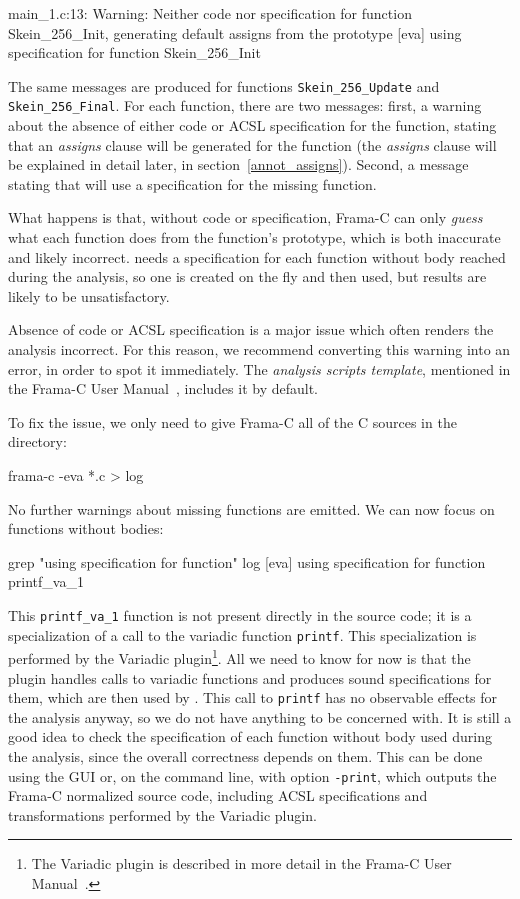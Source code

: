 \documentclass{frama-c-book}
\begin{document}
\begin{logsmath}
 main_1.c:13: Warning:
  Neither code nor specification for function Skein_256_Init,
  generating default assigns from the prototype
[eva] using specification for function Skein_256_Init
\end{logsmath}

The same messages are produced for functions \verb|Skein_256_Update| and
\verb|Skein_256_Final|.
For each function, there are two messages: first, a warning about the absence
of either code or ACSL specification for the function, stating
that an {\em assigns} clause will be generated for the function
(the {\em assigns} clause will be explained in detail later, in
section~\ref{annot_assigns}). Second, a message stating that \Eva{} will use a
specification for the missing function.

What happens is that, without code or specification, Frama-C can only
{\em guess} what each function does from the function's prototype,
which is both inaccurate and likely incorrect. \Eva{} needs a specification
for each function without body reached during the analysis, so one is created
on the fly and then used, but results are likely to be unsatisfactory.

\begin{important}
  Absence of code or ACSL specification is a major issue which often renders
  the analysis incorrect. For this reason, we recommend converting this warning
  into an error, in order to spot it immediately.
  The {\em analysis scripts template}, mentioned in the Frama-C User
  Manual~\cite{FCUserMan}, includes it by default.
\end{important}

To fix the issue, we only need to give Frama-C all of the C sources in
the directory:
\begin{frama-c-commands}
frama-c -eva *.c > log
\end{frama-c-commands}

No further warnings about missing functions are emitted. We can now focus on
functions without bodies:
\begin{shell}
grep "using specification for function" log
[eva] using specification for function printf_va_1
\end{shell}
This \verb|printf_va_1| function is not present directly in the source code;
it is a specialization of a call to the variadic function \verb|printf|. This
specialization is performed by the \textsf{Variadic} plugin\footnote{The
  \textsf{Variadic} plugin is described in more detail in the Frama-C User
  Manual~\cite{FCUserMan}.}.
All we need to know for now is that the plugin handles calls to variadic functions
and produces sound specifications for them, which are then used by \Eva{}.
This call to \verb|printf| has no observable effects for the analysis anyway,
so we do not have anything to be concerned with. It is still a good idea to
check the specification of each function without body used during the analysis,
since the overall correctness depends on them. This can be done using the
GUI or, on the command line, with option \verb|-print|, which outputs the
Frama-C normalized source code, including ACSL specifications and
transformations performed by the \textsf{Variadic} plugin.
\end{document}

